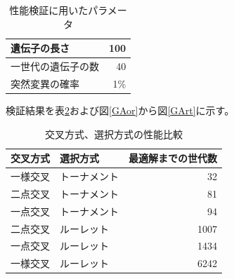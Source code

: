 \documentclass{jsarticle}
\begin{document}
\begin{table}[H]
	\caption{性能検証に用いたパラメータ\label{GA_params}}
	\begin{center}
		\begin{tabular}{|l|r|} \hline
			遺伝子の長さ & 100 \\ \hline
			一世代の遺伝子の数 & 40 \\ \hline
			突然変異の確率 & 1\% \\ \hline
		\end{tabular}
	\end{center}
\end{table}

検証結果を表\ref{GA_compare}および図\ref{GAor}から図\ref{GArt}に示す。

\begin{table}[H]
	\caption{交叉方式、選択方式の性能比較\label{GA_compare}}
	\begin{center}
		\begin{tabular}{|l|l|r|} \hline
			交叉方式 & 選択方式 & 最適解までの世代数 \\ \hline\hline
			一様交叉 & トーナメント & 32 \\ \hline
			二点交叉 & トーナメント & 81 \\ \hline
			一点交叉 & トーナメント & 94 \\ \hline
			二点交叉 & ルーレット & 1007 \\ \hline
			一点交叉 & ルーレット & 1434 \\ \hline
			一様交叉 & ルーレット & 6242 \\ \hline
		\end{tabular}
	\end{center}
\end{table}
\end{document}
